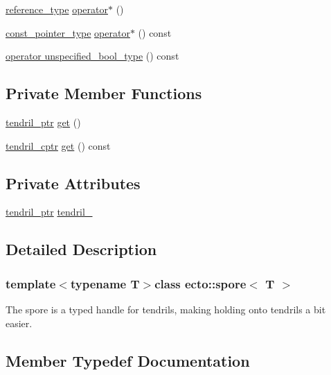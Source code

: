 \begin{DoxyCompactItemize}
\item 
\hyperlink{structecto_1_1spore_a79afa6b324736afc257bc89c6c770f81}{reference\+\_\+type} \hyperlink{structecto_1_1spore_a6d693f3096c3fede0c85351d36adaded}{operator$\ast$} ()
\item 
\hyperlink{structecto_1_1spore_af1219cc7b5343824699fc7f66a5c5891}{const\+\_\+pointer\+\_\+type} \hyperlink{structecto_1_1spore_ae13ad63a891e8ed71d9010c18b754588}{operator$\ast$} () const 
\item 
\hyperlink{structecto_1_1spore_ae47aff3850e59591aed5fe2ad0b8d567}{operator unspecified\+\_\+bool\+\_\+type} () const 
\end{DoxyCompactItemize}
\subsection*{Private Member Functions}
\begin{DoxyCompactItemize}
\item 
\hyperlink{namespaceecto_a84fb5f6130275382e5cbeb5fdececa78}{tendril\+\_\+ptr} \hyperlink{structecto_1_1spore_a42f435f8c44fea74854382e0526e36ca}{get} ()
\item 
\hyperlink{namespaceecto_ad01f26ee47597f71a6f86ee34bb3ffe4}{tendril\+\_\+cptr} \hyperlink{structecto_1_1spore_a07c4091d4e5c14c30de319ec0f14b7de}{get} () const 
\end{DoxyCompactItemize}
\subsection*{Private Attributes}
\begin{DoxyCompactItemize}
\item 
\hyperlink{namespaceecto_a84fb5f6130275382e5cbeb5fdececa78}{tendril\+\_\+ptr} \hyperlink{structecto_1_1spore_a17e2ffe6861f828cad58904d20f117d4}{tendril\+\_\+}
\end{DoxyCompactItemize}


\subsection{Detailed Description}
\subsubsection*{template$<$typename T$>$class ecto\+::spore$<$ T $>$}

The spore is a typed handle for tendrils, making holding onto tendrils a bit easier. 

\subsection{Member Typedef Documentation}
\hypertarget{structecto_1_1spore_af1219cc7b5343824699fc7f66a5c5891}{}
